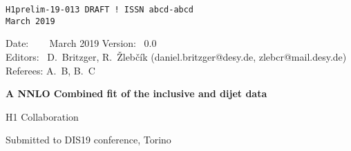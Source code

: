 \documentclass[12pt]{article}
\begin{document}
\begin{titlepage}
\noindent
\begin{flushleft}
{\tt H1prelim-19-013 DRAFT ! \hfill    ISSN abcd-abcd} \\
{\tt March 2019}                  \\
\end{flushleft}

\noindent
Date:   ~   \ \ March 2019 %
Version:~   0.0 \\
Editors:~   D.~Britzger, R.~\v{Z}leb\v{c}\'{i}k (daniel.britzger@desy.de, zlebcr@mail.desy.de) \\
Referees:  A.~B, B.~C \\
\noindent

\vspace{1cm}
\begin{center}
\begin{Large}

{\bf
   A NNLO Combined fit of the inclusive and dijet data

}

\vspace{1.5cm}

H1 Collaboration%

\end{Large}
\end{center}

\vspace{1.5cm}


\begin{abstract}
\noindent
A new combined fit of diffractive parton distribution functions (DPDFs) to the HERA inclusive and jet data in diffractive deep-inelastic scattering (DDIS) at next-to-next-to-leading order accuracy (NNLO) is presented.
The inclusion of the most comprehensive dijet cross section data, together with their NNLO predictions, provide enhanced constraints to the gluon component of the DPDF, which is of particular importance for diffractive PDFs.
Compared to the previous HERA fits, the presented fit includes the high-precision HERA-II data, which represents 40times higher luminosity for inclusive sample and 6times higher luminosity for the jet sample.
In addition to the inclusive DDIS sample at the nominal centre-of-mass energy $\sqrt{s}=319$, also the inclusive data at 252, 225 GeV are included into the fit.
The extracted DPDFs are compared to the alternative existing DPDFs, and are used to predict cross sections for large number of the available jet measurements and different observables.
\noindent
\end{abstract}


\begin{center} Submitted to DIS19 conference, Torino \end{center}

\end{titlepage}
\end{document}
